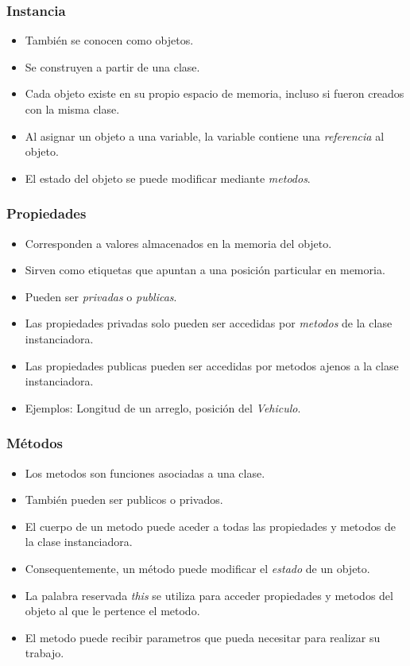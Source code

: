 \documentclass{beamer}
\begin{document}
\begin{frame}
\frametitle{Instancia}
\begin{itemize}
    \item Tambi\'en se conocen como objetos.
    \item Se construyen a partir de una clase.
    \item Cada objeto existe en su propio espacio de memoria, incluso si fueron creados con la misma clase.
    \item Al asignar un objeto a una variable, la variable contiene una \emph{referencia} al objeto.
    \item El estado del objeto se puede modificar mediante \emph{metodos}.
\end{itemize}
\end{frame}

\begin{frame}
\frametitle{Propiedades}
\begin{itemize}
    \item Corresponden a valores almacenados en la memoria del objeto.
    \item Sirven como etiquetas que apuntan a una posici\'on particular en memoria.
    \item Pueden ser \emph{privadas} o \emph{publicas}.
    \item Las propiedades privadas solo pueden ser accedidas por \emph{metodos} de la clase instanciadora.
    \item Las propiedades publicas pueden ser accedidas por metodos ajenos a la clase instanciadora.
    \item Ejemplos: Longitud de un arreglo, posici\'on del \emph{Vehiculo}.
\end{itemize}
\end{frame}

\begin{frame}
\frametitle{M\'etodos}
\begin{itemize}
    \item Los metodos son funciones asociadas a una clase.
    \item Tambi\'en pueden ser publicos o privados.
    \item El cuerpo de un metodo puede aceder a todas las propiedades y metodos de la clase instanciadora.
    \item Consequentemente, un m\'etodo puede modificar el \emph{estado} de un objeto.
    \item La palabra reservada \emph{this} se utiliza para acceder propiedades y metodos del objeto al que le pertence el metodo.
    \item El metodo puede recibir parametros que pueda necesitar para realizar su trabajo.
\end{itemize}
\end{frame}
\end{document}
